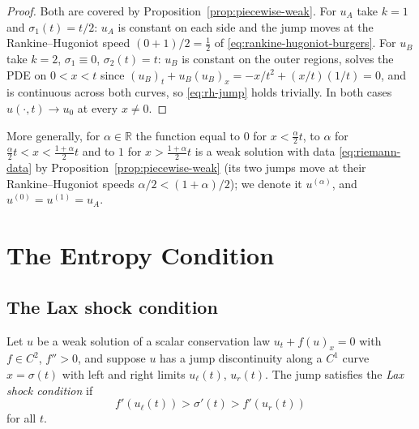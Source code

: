 \begin{proof}
Both are covered by Proposition~\ref{prop:piecewise-weak}. For $u_A$ take $k=1$ and
$\sigma_1(t)=t/2$: $u_A$ is constant on each side and the jump moves at the
Rankine--Hugoniot speed $(0+1)/2=\tfrac12$ of \eqref{eq:rankine-hugoniot-burgers}.
For $u_B$ take $k=2$, $\sigma_1\equiv0$, $\sigma_2(t)=t$: $u_B$ is constant on the
outer regions, solves the PDE on $0<x<t$ since
$(u_B)_t+u_B(u_B)_x=-x/t^2+(x/t)(1/t)=0$, and is continuous across both curves,
so \eqref{eq:rh-jump} holds trivially. In both cases $u(\cdot,t)\to u_0$ at
every $x\ne0$.
\end{proof}

\begin{remark}
\label{rem:infinite-family}
More generally, for $\alpha\in\mathbb{R}$ the function equal to $0$ for
$x<\tfrac\alpha2t$, to $\alpha$ for $\tfrac\alpha2t<x<\tfrac{1+\alpha}2t$ and to
$1$ for $x>\tfrac{1+\alpha}2t$ is a weak solution with data
\eqref{eq:riemann-data} by Proposition~\ref{prop:piecewise-weak} (its two jumps
move at their Rankine--Hugoniot speeds $\alpha/2<(1+\alpha)/2$); we denote it
$u^{(\alpha)}$, and $u^{(0)}=u^{(1)}=u_A$.\end{remark}


\section{The Entropy Condition}
\label{sec:entropy-condition}

\subsection{The Lax shock condition}
\label{subsec:lax-condition}

\begin{definition}
\label{def:lax}
Let $u$ be a weak solution of a scalar conservation law $u_t+f(u)_x=0$
with $f\in C^2$, $f''>0$, and suppose $u$ has a jump discontinuity along a $C^1$
curve $x=\sigma(t)$ with left and right limits $u_\ell(t)$, $u_r(t)$. The jump
satisfies the \emph{Lax shock condition} if
\begin{equation}
  \label{eq:lax-condition}
  f'(u_\ell(t)) > \sigma'(t) > f'(u_r(t))
\end{equation}
for all $t$.
\end{definition}

